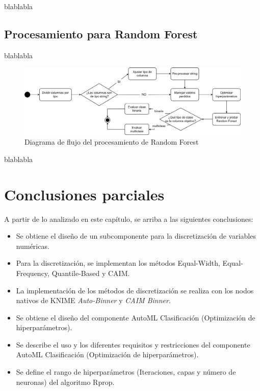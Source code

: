 blablabla



\subsection{Procesamiento para Random Forest}

blablabla

\begin{figure}[H]
	\centering
	\includegraphics[width=1\linewidth]{"figuras/capi 2/modelos/procesado rf.drawio"}
	\caption{Diagrama de flujo del procesamiento de Random Forest}
	\label{fig:procesado-rf}
\end{figure}

blablabla


\section{Conclusiones parciales}
A partir de lo analizado en este capítulo, se arriba a las siguientes conclusiones:
\begin{itemize}
	\item Se obtiene el diseño de un subcomponente para la discretización de variables numéricas.
	\item Para la discretización, se implementan los métodos Equal-Width, Equal-Frequency, Quantile-Based y CAIM.
	\item La implementación de los métodos de discretización se realiza con los nodos nativos de KNIME \textit{Auto-Binner} y \textit{CAIM Binner}.
	\item Se obtiene el diseño del componente AutoML Clasificación (Optimización de hiperparámetros).
	\item Se describe el uso y  los diferentes requisitos y restricciones del componente AutoML Clasificación (Optimización de hiperparámetros).
	\item Se define el rango de hiperparámetros (Iteraciones, capas y número de neuronas) del algoritmo Rprop.
\end{itemize}

\pagebreak

